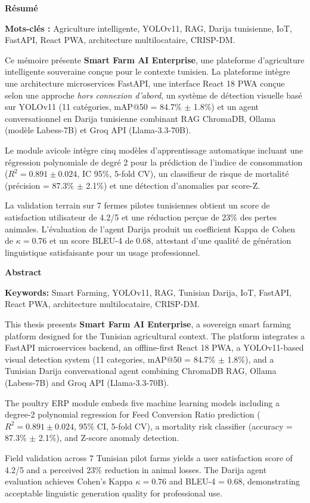 \clearpage
\thispagestyle{empty}
\begingroup
\small
\setlength{\parindent}{0pt}
\setlength{\parskip}{0.35em}
{\Large\bfseries Résumé}\par\medskip

\noindent\textbf{Mots-clés :} Agriculture intelligente, YOLOv11, RAG, Darija tunisienne, IoT,
FastAPI, React PWA, architecture multilocataire, CRISP-DM.

\medskip
Ce mémoire présente \textbf{Smart Farm AI Enterprise}, une plateforme d'agriculture
intelligente souveraine conçue pour le contexte tunisien. La plateforme intègre une
architecture microservices FastAPI, une interface React 18 PWA conçue selon une approche \textit{hors connexion d'abord}, un système
de détection visuelle basé sur YOLOv11 (11 catégories, mAP@50 = 84.7\% $\pm$ 1.8\%) et
un agent conversationnel en Darija tunisienne combinant RAG ChromaDB, Ollama
(modèle Labess-7B) et Groq API (Llama-3.3-70B).

Le module avicole intègre cinq modèles d'apprentissage automatique incluant
une régression polynomiale de degré 2 pour la prédiction de l'indice de consommation
($R^2 = 0.891 \pm 0.024$, IC 95\%, 5-fold CV), un classifieur de risque de mortalité (précision
= 87.3\% $\pm$ 2.1\%) et une détection d'anomalies par score-Z.

La validation terrain sur 7 fermes pilotes tunisiennes obtient un score de satisfaction utilisateur
de 4.2/5 et une réduction perçue de 23\% des pertes animales. L'évaluation de l'agent
Darija produit un coefficient Kappa de Cohen de $\kappa = 0.76$ et un score BLEU-4 de 0.68, attestant
d'une qualité de génération linguistique satisfaisante pour un usage professionnel.

\vspace{0.7cm}
{\Large\bfseries Abstract}\par\medskip

\noindent\textbf{Keywords:} Smart Farming, YOLOv11, RAG, Tunisian Darija, IoT, FastAPI,
React PWA, architecture multilocataire, CRISP-DM.

\medskip
This thesis presents \textbf{Smart Farm AI Enterprise}, a sovereign smart farming
platform designed for the Tunisian agricultural context. The platform integrates a
FastAPI microservices backend, an offline-first React 18 PWA, a YOLOv11-based visual
detection system (11 categories, mAP@50 = 84.7\% $\pm$ 1.8\%), and a Tunisian Darija
conversational agent combining ChromaDB RAG, Ollama (Labess-7B) and Groq API
(Llama-3.3-70B).

The poultry ERP module embeds five machine learning models including a degree-2
polynomial regression for Feed Conversion Ratio prediction ($R^2 = 0.891 \pm 0.024$, 95\% CI,
5-fold CV), a mortality risk classifier (accuracy = 87.3\% $\pm$ 2.1\%), and Z-score anomaly
detection.

Field validation across 7 Tunisian pilot farms yields a user satisfaction score of 4.2/5
and a perceived 23\% reduction in animal losses. The Darija agent evaluation achieves
Cohen's Kappa $\kappa = 0.76$ and BLEU-4 = 0.68, demonstrating acceptable linguistic
generation quality for professional use.
\endgroup

